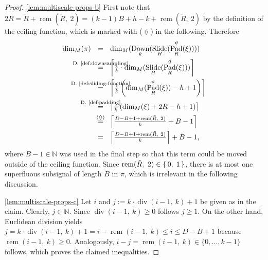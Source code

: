 \documentclass[journal]{IEEEtran}
\newcommand{\N}{\mathbb{N}}
\newcommand{\ROI}{B}
\newcommand{\discint}[2]{\{#1,\dotsc,#2\}}
\newcommand{\inint}[2]{\in\discint{#1}{#2}}
\DeclareMathOperator{\Slide}{Slide}
\renewcommand{\div}[2]{\operatorname{div}(#1,\ #2)}
\newcommand{\rem}[2]{\operatorname{rem}(#1,\ #2)}
\newcommand{\equsing}[1]{\overset{\mathclap{\text{#1}}}{=}}
\DeclareMathOperator{\Downsampling}{Down}
\DeclareMathOperator{\Padding}{Pad}
\newcommand{\PaddingParams}{\Padding_R^\vartheta}
\begin{document}
\begin{proof}
\ref{lem:multiscale-props-b}
First note that
$2R = \tilde{R} + \rem{\tilde{R}}{2} = (k - 1)\ROI + h - k + \rem{\tilde{R}}{2}$
by the definition of the ceiling function, which is marked with ($\lozenge$) in the following.
Therefore
\begin{align*}
  \dim_M(\pi)
  \ \ &=\ \ \dim_M(\Downsampling_k(\Slide_H(\PaddingParams(\xi))))\\
  &\equsing{D.~\ref{def:downsampling}}\ \ \left\lceil \tfrac{1}{k}\cdot\dim_M(\Slide_H(\PaddingParams(\xi))) \right\rceil\\
  &\equsing{D.~\ref{def:sliding-function}}\ \ \left\lceil \tfrac{1}{k}\left( \dim_M(\PaddingParams(\xi)) - h + 1 \right) \right\rceil\\
  &\equsing{D.~\ref{def:padding}}\ \ \left\lceil \tfrac{1}{k}\left( \dim_M(\xi) + 2R - h + 1 \right) \right\rceil\\
  &\equsing{($\lozenge$)}\ \ \left\lceil \tfrac{D - \ROI + 1 + \rem{\tilde{R}}{2}}{k} + \ROI - 1 \right\rceil\\
  &=\ \ \left\lceil \tfrac{D - \ROI + 1 + \rem{\tilde{R}}{2}}{k} \right\rceil + \ROI - 1\text{,}
\end{align*}
where $\ROI - 1\in\N$ was used in the final step so that this term could be moved outside of the ceiling function.
Since $\rem{\tilde{R}}{2}\in\set{0,\;1}$, there is at most one superfluous subsignal of length $B$ in $\pi$, which is irrelevant in the following discussion.

\ref{lem:multiscale-props-c}
Let $i$ and $j := k\cdot\div{i - 1}{k} + 1$ be given as in the claim.
Clearly, $j\in\N$.
Since $\div{i - 1}{k} \geq 0$ follows $j \geq 1$.
On the other hand, Euclidean division yields $j = k\cdot\div{i - 1}{k} + 1 = i - \rem{i - 1}{k} \leq i \leq D - \ROI + 1$ because $\rem{i - 1}{k} \geq 0$.
Analogously, $i - j = \rem{i - 1}{k}\inint{0}{k - 1}$ follows, which proves the claimed inequalities.


\end{proof}
\end{document}
